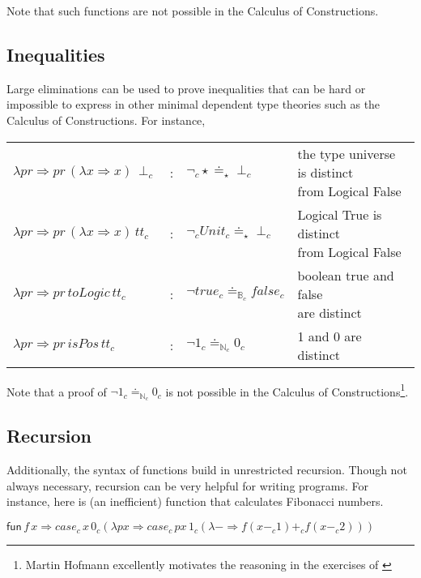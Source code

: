 Note that such functions are not possible in the Calculus of Constructions.

\subsection{Inequalities}

Large eliminations can be used to prove inequalities that can be hard or impossible to express in other minimal dependent type theories such as the Calculus of Constructions.
For instance,

\begin{tabular}{lcll}
  $\lambda pr\Rightarrow pr\,\left(\lambda x\Rightarrow x\right)\,\perp_{c}$ & : & $\lnot_{c}\star\doteq_{\star}\perp_{c}$ & \makecell{the type universe is distinct\\ from Logical False}\tabularnewline
  $\lambda pr\Rightarrow pr\,\left(\lambda x\Rightarrow x\right)\,tt_{c}$ & : & $\lnot_{c}Unit_{c}\doteq_{\star}\perp_{c}$ &  \makecell{Logical True is distinct\\ from Logical False}\tabularnewline
  $\lambda pr\Rightarrow pr\,toLogic\,tt_{c}$ & : & $\lnot true_{c}\doteq_{\mathbb{B}_{c}}false_{c}$ &  \makecell{boolean true and false\\ are distinct}\tabularnewline
  $\lambda pr\Rightarrow pr\,isPos\,tt_{c}$ & : & $\lnot1_{c}\doteq_{\mathbb{N}_{c}}0_{c}$ & 1 and 0 are distinct\tabularnewline
  \end{tabular}
  


Note that a proof of $\lnot1_{c}\doteq_{\mathbb{N}_{c}}0_{c}$ is not possible in the Calculus of Constructions\cite{10.2307/2274575}\footnote{
  Martin Hofmann excellently motivates the reasoning in the exercises of \cite{hofmann_1997}}.

\subsection{Recursion}

Additionally, the syntax of functions build in unrestricted recursion.
Though not always necessary, recursion can be very helpful for writing programs.
For instance, here is (an inefficient) function that calculates Fibonacci numbers.

$\mathsf{fun}\,f\,x\Rightarrow case_{c}\,x\,0_{c}\left(\lambda px\Rightarrow case_{c}\,px\,1_{c}\left(\lambda-\Rightarrow f\left(x-_{c}1\right)+_{c}f\left(x-_{c}2\right)\right)\right)$

